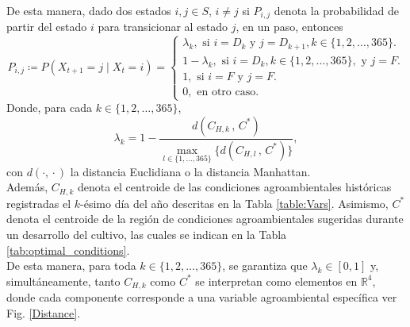 De esta manera, dado dos estados $i,j\in S$, $i\neq j$ si $P_{i,j}$ denota la probabilidad de partir del estado $i$ para transicionar al estado $j$, en un paso, entonces \begin{equation}
	P_{i, j} \coloneqq P(X_{t+1}= j\mid X_{t}= i ) = 
	\begin{cases}
		\lambda_k, \text{ si } i=D_k \text{ y } j= D_{k+1}, k\in \{1,2,\ldots,365\}.\\
		1-\lambda_k, \text{ si } i=D_k, k\in \{1,2,\ldots,365\}, \text{ y } j= F.\\
		1, \text{ si } i=F \text{ y } j= F.\\
		0, \text{ en otro caso.}
	\end{cases}
	\label{TransitionProbs}
\end{equation}
Donde, para cada $k\in \{1,2,\ldots, 365\}$, \begin{equation}
	\lambda_k= 1- \frac{d(C_{H,k} \,\mathbf{,}\, C^*)}{\displaystyle \max_{l\in \{1,\ldots, 365\}} \{d(C_{H,l}\, \mathbf{,} \,C^*)\}},
	\label{lambdas}
\end{equation}con $d(\cdot\mathbf{,} \cdot)$ la distancia Euclidiana o la distancia Manhattan.\\

Además, $C_{H,k}$ denota el centroide de las condiciones agroambientales históricas registradas el $k$-ésimo día del año descritas en la Tabla \ref{table:Vars}. Asimismo, $C^*$ denota el centroide de la región de condiciones agroambientales sugeridas durante un desarrollo del cultivo, las cuales se indican en la Tabla \ref{tab:optimal_conditions}.\\

De esta manera, para toda $k\in \{1,2,\ldots, 365\}$, se garantiza que $\lambda_k \in [0,1]$ y, simultáneamente, tanto $C_{H,k}$ como $C^*$ se interpretan como elementos en $\mathbb{R}^4$, donde cada componente corresponde a una variable agroambiental específica ver Fig. \ref{Distance}.


